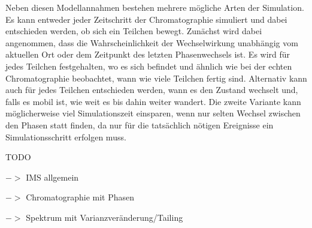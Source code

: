 \documentclass[a4paper,11pt]{article}
\begin{document}
Neben diesen Modellannahmen bestehen mehrere mögliche Arten der Simulation. Es kann entweder jeder Zeitschritt der Chromatographie simuliert und dabei entschieden werden, ob sich ein Teilchen bewegt. Zunächst wird dabei angenommen, dass die Wahrscheinlichkeit der Wechselwirkung unabhängig vom aktuellen Ort oder dem Zeitpunkt des letzten Phasenwechsels ist. Es wird für jedes Teilchen festgehalten, wo es sich befindet und ähnlich wie bei der echten Chromatographie beobachtet, wann wie viele Teilchen fertig sind. Alternativ kann auch für jedes Teilchen entschieden werden, wann es den Zustand wechselt und, falls es mobil ist, wie weit es bis dahin weiter wandert. Die zweite Variante kann möglicherweise viel Simulationszeit einsparen, wenn nur selten Wechsel zwischen den Phasen statt finden, da nur für die tatsächlich nötigen Ereignisse ein Simulationsschritt erfolgen muss.



\nocite{Baumbach2009}


TODO

$->$ IMS allgemein

$->$ Chromatographie mit Phasen

$->$ Spektrum mit Varianzveränderung/Tailing
\end{document}
